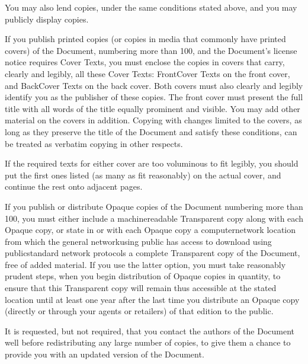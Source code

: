 \documentclass[letterpaper,10pt,english,openany,oneside]{sphinxmanual}
\begin{document}
\sphinxAtStartPar
You may also lend copies, under the same conditions stated above, and
you may publicly display copies.

\sphinxAtStartPar
{}

\sphinxAtStartPar
If you publish printed copies (or copies in media that commonly have
printed covers) of the Document, numbering more than 100, and the
Document’s license notice requires Cover Texts, you must enclose the
copies in covers that carry, clearly and legibly, all these Cover Texts:
Front\sphinxhyphen{}Cover Texts on the front cover, and Back\sphinxhyphen{}Cover Texts on the back
cover. Both covers must also clearly and legibly identify you as the
publisher of these copies. The front cover must present the full title
with all words of the title equally prominent and visible. You may add
other material on the covers in addition. Copying with changes limited
to the covers, as long as they preserve the title of the Document and
satisfy these conditions, can be treated as verbatim copying in other
respects.

\sphinxAtStartPar
If the required texts for either cover are too voluminous to fit
legibly, you should put the first ones listed (as many as fit
reasonably) on the actual cover, and continue the rest onto adjacent
pages.

\sphinxAtStartPar
If you publish or distribute Opaque copies of the Document numbering
more than 100, you must either include a machine\sphinxhyphen{}readable Transparent
copy along with each Opaque copy, or state in or with each Opaque copy a
computer\sphinxhyphen{}network location from which the general network\sphinxhyphen{}using public
has access to download using public\sphinxhyphen{}standard network protocols a
complete Transparent copy of the Document, free of added material. If
you use the latter option, you must take reasonably prudent steps, when
you begin distribution of Opaque copies in quantity, to ensure that this
Transparent copy will remain thus accessible at the stated location
until at least one year after the last time you distribute an Opaque
copy (directly or through your agents or retailers) of that edition to
the public.

\sphinxAtStartPar
It is requested, but not required, that you contact the authors of the
Document well before redistributing any large number of copies, to give
them a chance to provide you with an updated version of the Document.

\sphinxAtStartPar
{}
\end{document}
